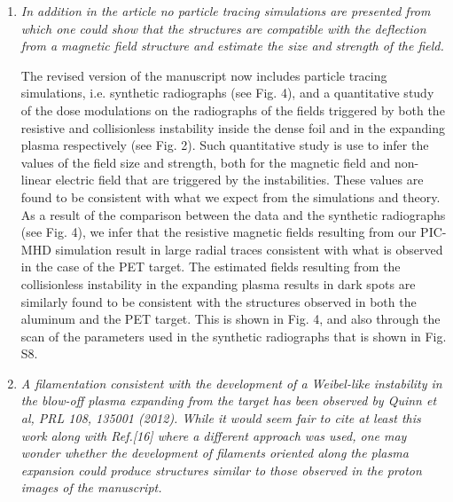 \documentclass[aps,showpacs,superscriptaddress]{revtex4}%
\begin{document}
\begin{enumerate}
\item \textit{In addition in the article no particle tracing simulations are presented from which one could show that the structures are compatible with the deflection from a magnetic field structure and estimate the size and strength of the field. }

The revised version of the manuscript now includes particle tracing simulations, i.e. synthetic radiographs (see Fig. 4), and a quantitative study of the dose modulations on the radiographs of the  fields triggered by both  the resistive and collisionless instability inside the dense foil and in the expanding plasma respectively (see Fig. 2). Such quantitative study is use to infer the values of the field size and strength, both for the magnetic field and non-linear electric field  that are triggered by the instabilities.  These values are found to be consistent with what we expect from the simulations and theory.
As a result of the comparison between the data and the synthetic radiographs (see Fig. 4), we infer that the resistive magnetic fields resulting from our PIC-MHD simulation result in large radial traces consistent with what is observed in the case of the PET target. The estimated fields resulting from the collisionless instability in the expanding plasma results in dark spots are similarly found to be consistent with the structures observed in both the aluminum and the PET target. This is shown in Fig. 4, and also through the scan of the parameters used in the synthetic radiographs that is shown in Fig. S8.

\item \textit{A filamentation consistent with the development of a Weibel-like instability in the blow-off plasma expanding from the target has been observed by Quinn et al, PRL 108, 135001 (2012). While it would seem fair to cite at least this work along with Ref.[16] where a different approach was used, one may wonder whether the development of filaments oriented along the plasma expansion could produce structures similar to those observed in the proton images of the manuscript. }


\end{enumerate}
\end{document}
